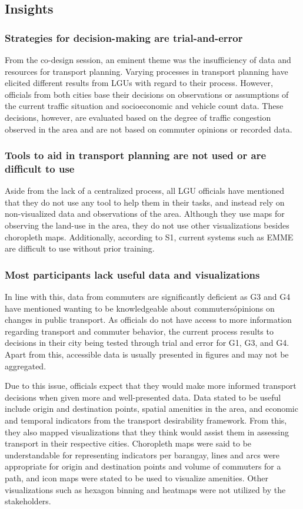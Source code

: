 \documentclass{sigchi}
\begin{document}
\subsection{Insights}
\subsubsection{Strategies for decision-making are trial-and-error}
From the co-design session, an eminent theme was the insufficiency of data and resources for transport planning. Varying processes in transport planning have elicited different results from LGUs with regard to their process. However, officials from both cities base their decisions on observations or assumptions of the current traffic situation and socioeconomic and vehicle count data. These decisions, however, are evaluated based on the degree of traffic congestion observed in the area and are not based on commuter opinions or recorded data. 

\subsubsection{Tools to aid in transport planning are not used or are difficult to use}
Aside from the lack of a centralized process, all LGU officials have mentioned that they do not use any tool to help them in their tasks, and instead rely on non-visualized data and observations of the area. Although they use maps for observing the land-use in the area, they do not use other visualizations besides choropleth maps. Additionally, according to S1, current systems such as EMME are difficult to use without prior training.  

\subsubsection{Most participants lack useful data and visualizations}
In line with this, data from commuters are significantly deficient as G3 and G4 have mentioned wanting to be knowledgeable about commuters\' opinions on changes in public transport. As officials do not have access to more information regarding transport and commuter behavior, the current process results to decisions in their city being tested through trial and error for G1, G3, and G4. Apart from this, accessible data is usually presented in figures and may not be aggregated.

Due to this issue, officials expect that they would make more informed transport decisions when given more and well-presented data. Data stated to be useful include origin and destination points, spatial amenities in the area, and economic and temporal indicators from the transport desirability framework. From this, they also mapped visualizations that they think would assist them in assessing transport in their respective cities. Choropleth maps were said to be understandable for representing indicators per barangay, lines and arcs were appropriate for origin and destination points and volume of commuters for a path, and icon maps were stated to be used to visualize amenities. Other visualizations such as hexagon binning and heatmaps were not utilized by the stakeholders.
\end{document}
